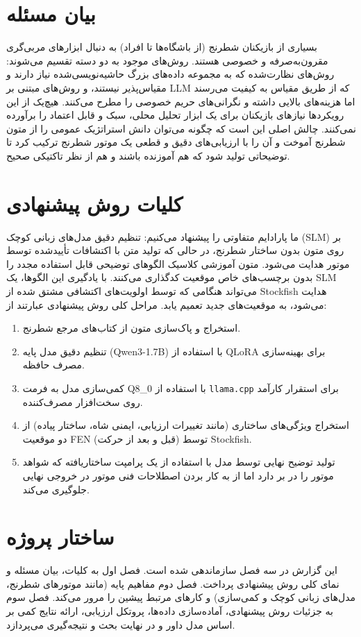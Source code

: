 \documentclass[a4paper,12pt]{report}
\begin{document}
\section{بیان مسئله}
بسیاری از بازیکنان شطرنج (از باشگاه‌ها تا افراد) به دنبال ابزارهای مربی‌گری مقرون‌به‌صرفه و خصوصی هستند. روش‌های موجود به دو دسته تقسیم می‌شوند: روش‌های نظارت‌شده که به مجموعه داده‌های بزرگ حاشیه‌نویسی‌شده نیاز دارند و مقیاس‌پذیر نیستند، و روش‌های مبتنی بر LLM که از طریق مقیاس به کیفیت می‌رسند اما هزینه‌های بالایی داشته و نگرانی‌های حریم خصوصی را مطرح می‌کنند. هیچ‌یک از این رویکردها نیازهای بازیکنان برای یک ابزار تحلیل محلی، سبک و قابل اعتماد را برآورده نمی‌کنند. چالش اصلی این است که چگونه می‌توان دانش استراتژیک عمومی را از متون شطرنج آموخت و آن را با ارزیابی‌های دقیق و قطعی یک موتور شطرنج ترکیب کرد تا توضیحاتی تولید شود که هم آموزنده باشند و هم از نظر تاکتیکی صحیح.

\section{کلیات روش پیشنهادی}
ما پارادایم متفاوتی را پیشنهاد می‌کنیم: تنظیم دقیق مدل‌های زبانی کوچک (SLM) بر روی متون بدون ساختار شطرنج، در حالی که تولید متن با اکتشافات تأییدشده توسط موتور هدایت می‌شود. متون آموزشی کلاسیک الگوهای توضیحی قابل استفاده مجدد را بدون برچسب‌های خاص موقعیت کدگذاری می‌کنند. با یادگیری این الگوها، یک SLM می‌تواند هنگامی که توسط اولویت‌های اکتشافی مشتق شده از Stockfish هدایت می‌شود، به موقعیت‌های جدید تعمیم یابد.
مراحل کلی روش پیشنهادی عبارتند از:
\begin{enumerate}
    \item استخراج و پاک‌سازی متون از کتاب‌های مرجع شطرنج.
    \item تنظیم دقیق مدل پایه (Qwen3-1.7B) با استفاده از QLoRA برای بهینه‌سازی مصرف حافظه.
    \item کمی‌سازی مدل به فرمت Q8\_0 با استفاده از \texttt{llama.cpp} برای استقرار کارآمد روی سخت‌افزار مصرف‌کننده.
    \item استخراج ویژگی‌های ساختاری (مانند تغییرات ارزیابی، ایمنی شاه، ساختار پیاده) از دو موقعیت FEN (قبل و بعد از حرکت) توسط Stockfish.
    \item تولید توضیح نهایی توسط مدل با استفاده از یک پرامپت ساختاریافته که شواهد موتور را در بر دارد اما از به کار بردن اصطلاحات فنی موتور در خروجی نهایی جلوگیری می‌کند.
\end{enumerate}

\section{ساختار پروژه}
این گزارش در سه فصل سازماندهی شده است. فصل اول به کلیات، بیان مسئله و نمای کلی روش پیشنهادی پرداخت. فصل دوم مفاهیم پایه (مانند موتورهای شطرنج، مدل‌های زبانی کوچک و کمی‌سازی) و کارهای مرتبط پیشین را مرور می‌کند. فصل سوم به جزئیات روش پیشنهادی، آماده‌سازی داده‌ها، پروتکل ارزیابی، ارائه نتایج کمی بر اساس مدل داور و در نهایت بحث و نتیجه‌گیری می‌پردازد.
\end{document}
